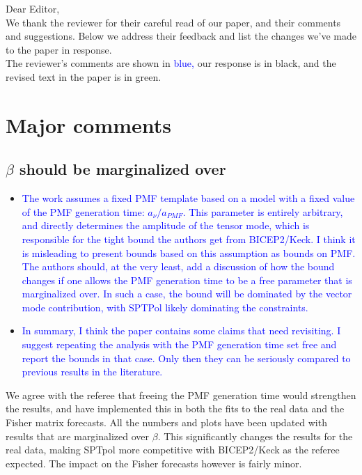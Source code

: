 \documentclass{article}
\newcommand{\reviewer}[1]{\textcolor{Blue}{#1}}
\newcommand{\diff}[1]{\textcolor{PineGreen}{#1}}
\begin{document}
Dear Editor,\\

We thank the reviewer for their  careful read of our paper, and their comments and suggestions. Below we address their feedback and list the changes we've made to the paper in response.\\


The reviewer's comments are shown in \reviewer{blue,} our response is in black, and the revised text in the paper is in \diff{green}. \\

\section{Major comments}


\subsection{$\beta$ should be marginalized over}
\begin{itemize}
\item \reviewer{The work assumes a fixed PMF template based on a model with a fixed value of the PMF generation time: $a_{\nu}/a_{PMF}$. This parameter is entirely arbitrary, and directly determines the amplitude of the tensor mode, which is responsible for the tight bound the authors get from BICEP2/Keck. I think it is misleading to present bounds based on this assumption as bounds on PMF. The authors should, at the very least, add a discussion of how the bound changes if one allows the PMF generation time to be a free parameter that is marginalized over. In such a case, the bound will be dominated by the vector mode contribution, with SPTPol likely dominating the constraints.}

\item \reviewer{In summary, I think the paper contains some claims that need revisiting. I suggest repeating the analysis with the PMF generation time set free and report the bounds in that case. Only then they can be seriously compared to previous results in the literature.}
\end{itemize}

We agree with the referee that freeing the PMF generation time would strengthen the results, and have implemented this in both the fits to the real data and the Fisher matrix forecasts. All the numbers and plots have been updated with results that are marginalized over $\beta$. 
This significantly changes the results for the real data, making SPTpol more competitive with BICEP2/Keck as the referee expected. 
The impact on the Fisher forecasts however is fairly minor.\\
\end{document}
